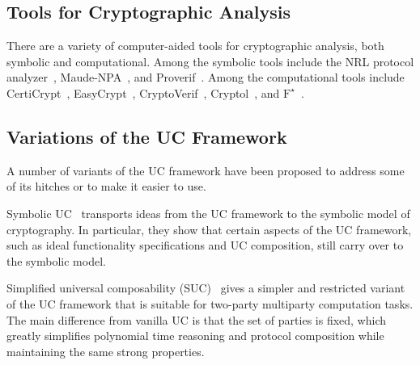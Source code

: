 \subsection{Tools for Cryptographic Analysis}
\label{subsec:tools}

There are a variety of computer-aided tools for cryptographic analysis, both
symbolic and computational. Among the symbolic tools include the NRL protocol
analyzer~\cite{meadows1996nrl}, Maude-NPA~\cite{escobar2009maude}, and
Proverif~\cite{blanchet2010proverif}. Among the computational tools include
CertiCrypt~\cite{barthe2009formal}, EasyCrypt~\cite{barthe2011computer},
CryptoVerif~\cite{blanchet2007cryptoverif}, Cryptol~\cite{lewis2003cryptol}, and
$\text{F}^{\star}$~\cite{swamy2016dependent}.


\subsection{Variations of the UC Framework}
\label{subsec:uc-variants}

A number of variants of the UC framework have been proposed to address some of
its hitches or to make it easier to use.

Symbolic UC~\cite{bohl2016symbolic} transports ideas from the UC framework to
the symbolic model of cryptography. In particular, they show that certain
aspects of the UC framework, such as ideal functionality specifications and UC
composition, still carry over to the symbolic model.

Simplified universal composability (SUC)~\cite{canetti2015simpler} gives a
simpler and restricted variant of the UC framework that is suitable for
two-party multiparty computation tasks. The main difference from vanilla UC is
that the set of parties is fixed, which greatly simplifies polynomial time
reasoning and protocol composition while maintaining the same strong properties.

